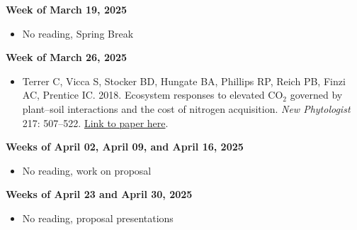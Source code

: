 \documentclass[12pt, notitlepage]{article}   	%
\begin{document}
{\textbf{Week of March 19, 2025}
\begin{itemize}
    \item No reading, Spring Break
\end{itemize}

\textbf{Week of March 26, 2025}
\begin{itemize}
    \item Terrer C, Vicca S, Stocker BD, Hungate BA, Phillips RP, Reich PB, Finzi AC, Prentice IC. 2018. Ecosystem responses to elevated CO$_2$ governed by plant–soil interactions and the cost of nitrogen acquisition. \textit{New Phytologist} 217: 507–522. \href{https://nph.onlinelibrary.wiley.com/doi/full/10.1111/nph.14872}{Link to paper here}.
\end{itemize}

\textbf{Weeks of April 02, April 09, and April 16, 2025}
\begin{itemize}
    \item No reading, work on proposal
\end{itemize}

\textbf{Weeks of April 23 and April 30, 2025}
\begin{itemize}
    \item No reading, proposal presentations
\end{itemize}

} %
\end{document}
